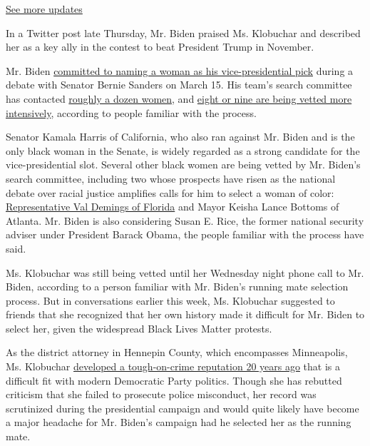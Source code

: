 \href{https://www.nytimes3xbfgragh.onion/2020/08/03/us/elections/biden-vs-trump.html?action=click\&pgtype=Article\&state=default\&region=MAIN_CONTENT_1\&context=storylines_live_updates}{See
more updates}

In a Twitter post late Thursday, Mr. Biden praised Ms. Klobuchar and
described her as a key ally in the contest to beat President Trump in
November.

Mr. Biden
\href{https://www.nytimes3xbfgragh.onion/2020/03/15/us/politics/joe-biden-female-vice-president.html}{committed
to naming a woman as his vice-presidential pick} during a debate with
Senator Bernie Sanders on March 15. His team's search committee has
contacted
\href{https://www.nytimes3xbfgragh.onion/article/biden-vice-president-2020.html}{roughly
a dozen women}, and
\href{https://www.nytimes3xbfgragh.onion/2020/06/13/us/politics/joe-biden-vice-president.html}{eight
or nine are being vetted more intensively}, according to people familiar
with the process.

Senator Kamala Harris of California, who also ran against Mr. Biden and
is the only black woman in the Senate, is widely regarded as a strong
candidate for the vice-presidential slot. Several other black women are
being vetted by Mr. Biden's search committee, including two whose
prospects have risen as the national debate over racial justice
amplifies calls for him to select a woman of color:
\href{https://demings.house.gov/}{Representative Val Demings of Florida}
and Mayor Keisha Lance Bottoms of Atlanta. Mr. Biden is also considering
Susan E. Rice, the former national security adviser under President
Barack Obama, the people familiar with the process have said.

Ms. Klobuchar was still being vetted until her Wednesday night phone
call to Mr. Biden, according to a person familiar with Mr. Biden's
running mate selection process. But in conversations earlier this week,
Ms. Klobuchar suggested to friends that she recognized that her own
history made it difficult for Mr. Biden to select her, given the
widespread Black Lives Matter protests.

As the district attorney in Hennepin County, which encompasses
Minneapolis, Ms. Klobuchar
\href{https://www.nytimes3xbfgragh.onion/2020/02/26/us/klobuchar-prosecutor-myon-burrell.html}{developed
a tough-on-crime reputation 20 years ago} that is a difficult fit with
modern Democratic Party politics. Though she has rebutted criticism that
she failed to prosecute police misconduct, her record was scrutinized
during the presidential campaign and would quite likely have become a
major headache for Mr. Biden's campaign had he selected her as the
running mate.

